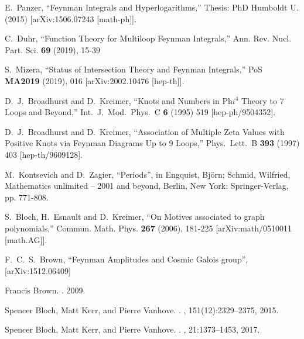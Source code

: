 \documentclass[a4paper,12pt]{article}
\numberwithin{equation}{section}
\numberwithin{figure}{section}
\begin{document}
\begin{thebibliography}{99}
E.~Panzer,
``Feynman Integrals and Hyperlogarithms,''
Thesis: PhD Humboldt U. (2015)
[arXiv:1506.07243 [math-ph]].

C.~Duhr,
``Function Theory for Multiloop Feynman Integrals,''
Ann. Rev. Nucl. Part. Sci. \textbf{69} (2019), 15-39



  
S.~Mizera,
``Status of Intersection Theory and Feynman Integrals,''
PoS \textbf{MA2019} (2019), 016
[arXiv:2002.10476 [hep-th]].

D.~J.~Broadhurst and D.~Kreimer,
``Knots and Numbers in Ph$ i^4$ Theory to 7 Loops and Beyond,''
Int.\ J.\ Mod.\ Phys.\ C {\bf 6} (1995) 519
[hep-ph/9504352].

D.~J.~Broadhurst and D.~Kreimer,
``Association of Multiple Zeta Values with Positive Knots via Feynman Diagrams Up to 9 Loops,''
Phys.\ Lett.\ B {\bf 393} (1997) 403
[hep-th/9609128].


M.~Kontsevich and D.~Zagier, ``Periods'', in Engquist, Bj\"orn; Schmid,
Wilfried, Mathematics unlimited -- 2001 and beyond, Berlin, New York:
Springer-Verlag, pp. 771-808.

S.~Bloch, H.~Esnault and D.~Kreimer,
``On Motives associated to graph polynomials,''
Commun. Math. Phys. \textbf{267} (2006), 181-225
[arXiv:math/0510011 [math.AG]].


 F.~C.~S.~Brown, ``Feynman Amplitudes and Cosmic
  Galois group'', [arXiv:1512.06409]



Francis Brown.
.
 2009.
\newblock [arXiv:0910.0114]  

Spencer Bloch, Matt Kerr, and Pierre Vanhove.
.
, 151(12):2329--2375, 2015.
\newblock [arXiv:1406.2664] 

Spencer Bloch, Matt Kerr, and Pierre Vanhove.
.
, 21:1373--1453, 2017.
\newblock [arXiv:1601.08181]


\end{thebibliography}
\end{document}

